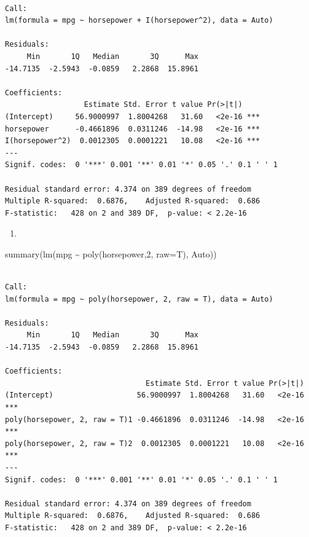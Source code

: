\documentclass[
  letterpaper,
  DIV=11,
  numbers=noendperiod]{scrreprt}
\newenvironment{Shaded}{\begin{snugshade}}{\end{snugshade}}
\newcommand{\AttributeTok}[1]{\textcolor[rgb]{0.65,0.35,0.00}{#1}}
\newcommand{\DecValTok}[1]{\textcolor[rgb]{0.47,0.16,0.63}{#1}}
\newcommand{\FunctionTok}[1]{\textcolor[rgb]{0.02,0.16,0.49}{#1}}
\newcommand{\NormalTok}[1]{\textcolor[rgb]{0.33,0.33,0.33}{#1}}
\newcommand{\SpecialCharTok}[1]{\textcolor[rgb]{0.00,0.46,0.62}{#1}}
\providecommand{\tightlist}{%
  \setlength{\itemsep}{0pt}\setlength{\parskip}{0pt}}\usepackage{longtable,booktabs,array}
\begin{document}
\begin{verbatim}

Call:
lm(formula = mpg ~ horsepower + I(horsepower^2), data = Auto)

Residuals:
     Min       1Q   Median       3Q      Max 
-14.7135  -2.5943  -0.0859   2.2868  15.8961 

Coefficients:
                  Estimate Std. Error t value Pr(>|t|)    
(Intercept)     56.9000997  1.8004268   31.60   <2e-16 ***
horsepower      -0.4661896  0.0311246  -14.98   <2e-16 ***
I(horsepower^2)  0.0012305  0.0001221   10.08   <2e-16 ***
---
Signif. codes:  0 '***' 0.001 '**' 0.01 '*' 0.05 '.' 0.1 ' ' 1

Residual standard error: 4.374 on 389 degrees of freedom
Multiple R-squared:  0.6876,    Adjusted R-squared:  0.686 
F-statistic:   428 on 2 and 389 DF,  p-value: < 2.2e-16
\end{verbatim}

\begin{enumerate}
\def\labelenumi{\arabic{enumi}.}
\setcounter{enumi}{2}
\tightlist
\item
\end{enumerate}

\begin{Shaded}
\begin{Highlighting}[]
\FunctionTok{summary}\NormalTok{(}\FunctionTok{lm}\NormalTok{(mpg }\SpecialCharTok{\textasciitilde{}} \FunctionTok{poly}\NormalTok{(horsepower,}\DecValTok{2}\NormalTok{, }\AttributeTok{raw=}\NormalTok{T), Auto))}
\end{Highlighting}
\end{Shaded}

\begin{verbatim}

Call:
lm(formula = mpg ~ poly(horsepower, 2, raw = T), data = Auto)

Residuals:
     Min       1Q   Median       3Q      Max 
-14.7135  -2.5943  -0.0859   2.2868  15.8961 

Coefficients:
                                Estimate Std. Error t value Pr(>|t|)    
(Intercept)                   56.9000997  1.8004268   31.60   <2e-16 ***
poly(horsepower, 2, raw = T)1 -0.4661896  0.0311246  -14.98   <2e-16 ***
poly(horsepower, 2, raw = T)2  0.0012305  0.0001221   10.08   <2e-16 ***
---
Signif. codes:  0 '***' 0.001 '**' 0.01 '*' 0.05 '.' 0.1 ' ' 1

Residual standard error: 4.374 on 389 degrees of freedom
Multiple R-squared:  0.6876,    Adjusted R-squared:  0.686 
F-statistic:   428 on 2 and 389 DF,  p-value: < 2.2e-16
\end{verbatim}
\end{document}
